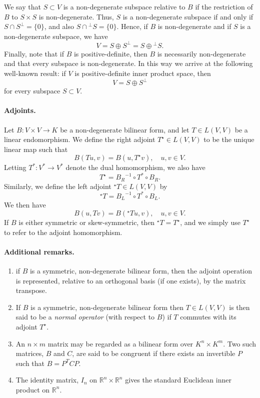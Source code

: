 \documentclass{article}
\newcommand{\Rset}{\mathbb{R}}
\begin{document}
We say that $S\subset V$ is a non-degenerate subspace relative to $B$
if the restriction of $B$ to $S\times S$ is non-degenerate.  Thus, $S$
is a non-degenerate subspace if and only if $S \cap S^\perp = \{0\}$,
and also $S\cap {}^\perp S = \{ 0\}$.  Hence, if $B$ is non-degenerate
and if $S$ is a non-degenerate
subspace, we have
\[ V = S \oplus S^\perp = S\oplus {}^\perp S.\] Finally, note that if
$B$ is positive-definite, then $B$ is necessarily non-degenerate and
that every subspace is non-degenerate.  In this way we arrive at the
following well-known result: if $V$ is positive-definite inner product
space, then
\[V = S \oplus S^\perp \] for every subspace $S\subset V$.

\paragraph{Adjoints.}
Let $B: V \times V \rightarrow K$ be a non-degenerate bilinear
form, and let  $T \in L(V,V)$ be a linear endomorphism.  We define the
right adjoint $T^\star \in 
L(V,V)$ to be the unique linear map such that
\[ B(Tu, v) = B(u, T^\star v) ,\quad u,v \in V.\]
Letting $T^\ast : V^\ast \to V^\ast$ denote the  dual homomorphism,
we also have
\[ T^\star = {B_R}^{-1} \circ T^\ast \circ B_R.\]
Similarly, we define the left adjoint ${}^\star T\in L(V,V)$ by
\[ {}^\star T = {B_L}^{-1} \circ T^\ast \circ B_L.\] We then have
\[ B(u, Tv) = B({}^\star  T u, v) ,\quad u,v \in V.\]
If $B$ is either symmetric or skew-symmetric, then ${}^\star T =
T^\star$, and we simply use $T^\star$ to refer to the adjoint homomorphism.

\paragraph{Additional remarks.}
\begin{enumerate}
\item 
if $B$ is a symmetric, non-degenerate bilinear form,
then the adjoint operation is represented, relative to an orthogonal
basis (if one exists), by the matrix transpose.

\item  If $B$ is a symmetric, non-degenerate bilinear form
then $T\in L(V,V)$ is then said to be a \emph{normal operator} (with
respect to $B$) if $T$ commutes with its adjoint $T^\star$.


\item An $n \times m$ matrix may be regarded as a bilinear form over
  $K^n\times K^m$. Two such matrices, $B$ and $C$, are said to be
  congruent if there exists an invertible $P$ such that $B = P^{T}CP$.

\item The identity matrix, $I_n$ on $\Rset^n\times \Rset^n$ gives the standard
Euclidean inner product on $\Rset^n$.
\end{enumerate}
\end{document}

